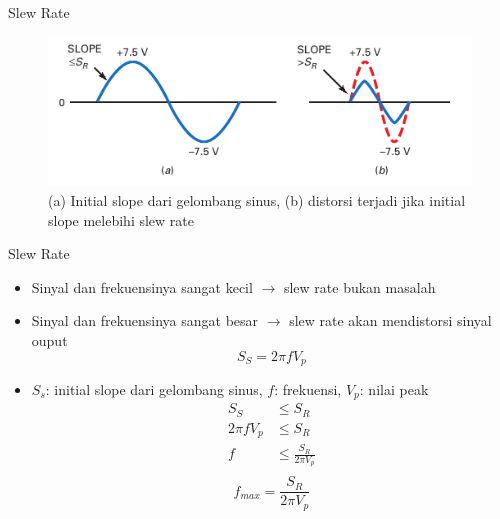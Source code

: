 \begin{frame}{Slew Rate}
	\begin{figure}
		\centering
		\includegraphics[width=0.7\linewidth]{gambar/fig-16.09}
		\caption{(a) Initial slope dari gelombang sinus, (b) distorsi terjadi jika initial slope melebihi slew rate}
		\label{fig-16.09}
	\end{figure}
\end{frame}

\begin{frame}{Slew Rate}
	\begin{itemize}
		\item Sinyal dan frekuensinya sangat kecil $ \rightarrow $ slew rate bukan masalah
		\item Sinyal dan frekuensinya sangat besar $ \rightarrow $ slew rate akan mendistorsi sinyal ouput
		\[ S_S = 2 \pi f V_p \]
		\item $ S_s $: initial slope dari gelombang sinus, $ f $: frekuensi, $ V_p $: nilai peak
		\begin{align*}
			S_S &\leq S_R \\
			2 \pi f V_p &\leq S_R \\
			f &\leq \frac{S_R}{2 \pi V_p} \\
		\end{align*}
		\begin{equation} \label{pers.16.2}
			f_{max} = \frac{S_R}{2 \pi V_p}
		\end{equation}
	\end{itemize}
\end{frame}

